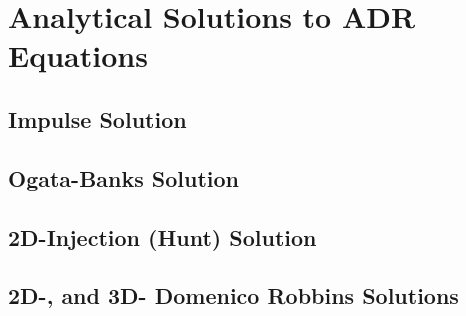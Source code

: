 \section{Analytical Solutions to ADR Equations}
\subsection{Impulse Solution}
\subsection{Ogata-Banks Solution}
\subsection{2D-Injection (Hunt) Solution}
\subsection{2D-, and 3D- Domenico Robbins Solutions}
